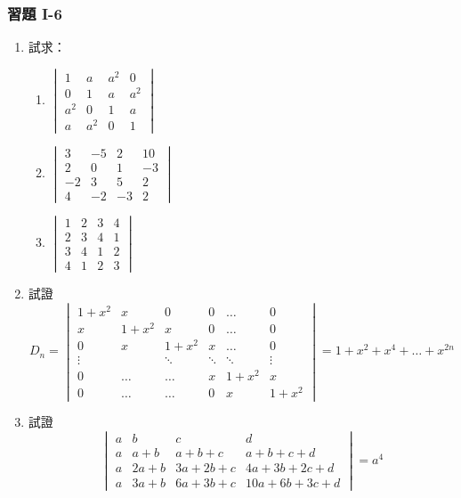 \subsubsection*{習題 I-6}\label{sec:b6-ex1-6}

\begin{enumerate}[label=\arabic*., leftmargin=2em]
  \item 試求：
  \begin{enumerate}[label=(\roman*)]
    \item $\begin{vmatrix}
    1 & a & a^2 & 0 \\
    0 & 1 & a & a^2 \\
    a^2 & 0 & 1 & a \\
    a & a^2 & 0 & 1
    \end{vmatrix}$
    \item $\begin{vmatrix}
    3 & -5 & 2 & 10 \\
    2 & 0 & 1 & -3 \\
    -2 & 3 & 5 & 2 \\
    4 & -2 & -3 & 2
    \end{vmatrix}$
    \item $\begin{vmatrix}
    1 & 2 & 3 & 4 \\
    2 & 3 & 4 & 1 \\
    3 & 4 & 1 & 2 \\
    4 & 1 & 2 & 3
    \end{vmatrix}$
  \end{enumerate}

  \item 試證
  \[ D_n = \begin{vmatrix}
  1+x^2 & x & 0 & 0 & \dots & 0 \\
  x & 1+x^2 & x & 0 & \dots & 0 \\
  0 & x & 1+x^2 & x & \dots & 0 \\
  \vdots & & \ddots & \ddots & \ddots & \vdots \\
  0 & \dots & \dots & x & 1+x^2 & x \\
  0 & \dots & \dots & 0 & x & 1+x^2
  \end{vmatrix} = 1 + x^2 + x^4 + \dots + x^{2n} \]

  \item 試證
  \[ \begin{vmatrix}
  a & b & c & d \\
  a & a+b & a+b+c & a+b+c+d \\
  a & 2a+b & 3a+2b+c & 4a+3b+2c+d \\
  a & 3a+b & 6a+3b+c & 10a+6b+3c+d
  \end{vmatrix} = a^4 \]


\end{enumerate}
